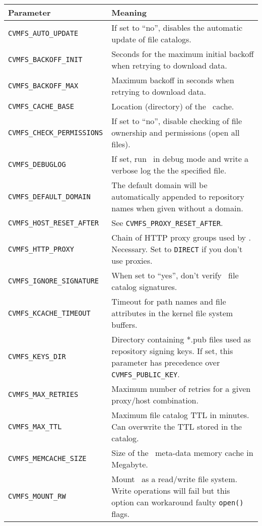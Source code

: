 	\begin{longtable}{lX}
		\toprule
		{\bf\centering Parameter} 			& {\bf\centering Meaning}\\
		\midrule
		\tt CVMFS\_AUTO\_UPDATE			& If set to ``no'', disables the automatic update of file catalogs.\\
		\tt CVMFS\_BACKOFF\_INIT			& Seconds for the maximum initial backoff when retrying to download data.\\ 
		\tt CVMFS\_BACKOFF\_MAX			& Maximum backoff in seconds when retrying to download data.\\
		\tt CVMFS\_CACHE\_BASE				& Location (directory) of the \cvmfs\ cache.\\
		\tt CVMFS\_CHECK\_PERMISSIONS		& If set to ``no'', disable checking of file ownership and permissions (open all files).\\
		\tt CVMFS\_DEBUGLOG				& If set, run \cvmfs\ in debug mode and write a verbose log the the specified file.\\
		\tt CVMFS\_DEFAULT\_DOMAIN			& The default domain will be automatically appended to repository names when given without a domain.\\
		\tt CVMFS\_HOST\_RESET\_AFTER		& See \texttt{CVMFS\_PROXY\_RESET\_AFTER}.\\
		\tt CVMFS\_HTTP\_PROXY				& Chain of HTTP proxy groups used by \cvmfs. Necessary. Set to \texttt{DIRECT} if you don't use proxies.\\
		\tt CVMFS\_IGNORE\_SIGNATURE		& When set to ``yes'', don't verify \cvmfs\ file catalog signatures.\\
		\tt CVMFS\_KCACHE\_TIMEOUT			& Timeout for path names and file attributes in the kernel file system buffers.\\
		\tt CVMFS\_KEYS\_DIR				& Directory containing *.pub files used as repository signing keys.  If set, this parameter has precedence over \texttt{CVMFS\_PUBLIC\_KEY}.\\
		\tt CVMFS\_MAX\_RETRIES			& Maximum number of retries for a given proxy/host combination.\\
		\tt CVMFS\_MAX\_TTL				& Maximum file catalog TTL in minutes.  Can overwrite the TTL stored in the catalog.\\
		\tt CVMFS\_MEMCACHE\_SIZE			& Size of the \cvmfs\ meta-data memory cache in Megabyte.\\
		\tt CVMFS\_MOUNT\_RW				& Mount \cvmfs\ as a read/write file system.  Write operations will fail but this option can workaround faulty \texttt{open()} flags.\\

\end{longtable}
